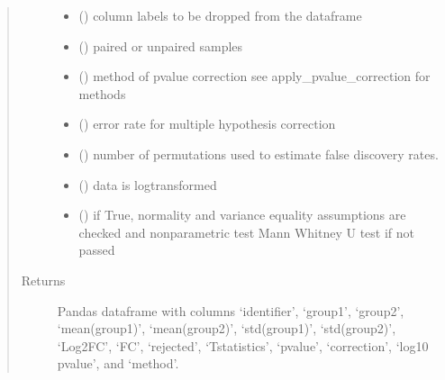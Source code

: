 \documentclass[letterpaper,10pt,english]{sphinxmanual}
\begin{document}
\begin{fulllineitems}
\begin{quote}
\begin{description}
\begin{itemize}
\item {} 
 () \textendash{} column labels to be dropped from the dataframe

\item {} 
 () \textendash{} paired or unpaired samples

\item {} 
 () \textendash{} method of pvalue correction see apply\_pvalue\_correction for methods

\item {} 
 () \textendash{} error rate for multiple hypothesis correction

\item {} 
 () \textendash{} number of permutations used to estimate false discovery rates.

\item {} 
 () \textendash{} data is log\sphinxhyphen{}transformed

\item {} 
 () \textendash{} if True, normality and variance equality assumptions are checked and non\sphinxhyphen{}parametric test Mann Whitney U test if not passed

\end{itemize}

\item[{Returns}] \leavevmode
Pandas dataframe with columns ‘identifier’, ‘group1’, ‘group2’, ‘mean(group1)’, ‘mean(group2)’, ‘std(group1)’, ‘std(group2)’, ‘Log2FC’, ‘FC’, ‘rejected’, ‘T\sphinxhyphen{}statistics’, ‘p\sphinxhyphen{}value’, ‘correction’, ‘\sphinxhyphen{}log10 p\sphinxhyphen{}value’, and ‘method’.


\end{description}
\end{quote}
\end{fulllineitems}
\end{document}
